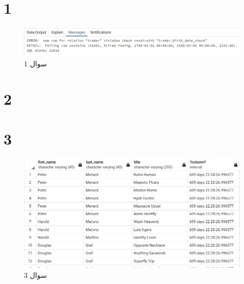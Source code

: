 \documentclass{article}
\begin{document}


\newpage


\section{1}
\begin{figure}[H]
    \centering
    \includegraphics[width=1\textwidth]{figures/1.jpg}
    \caption
	{
سوال 1
	}
    \label{fig:fig1}
\end{figure}


\section{2}


\section{3}
\begin{figure}[H]
    \centering
    \includegraphics[width=1\textwidth]{figures/3.jpg}
    \caption
	{
سوال 3
	}
    \label{fig:fig1}
\end{figure}
\end{document}
